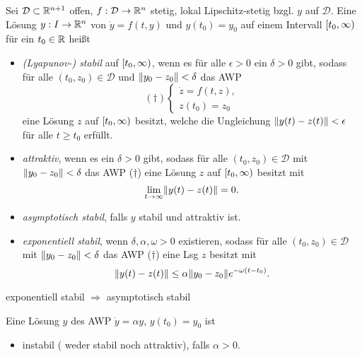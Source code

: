 \documentclass{cheat-sheet}
\newcommand{\D}{\mathcal{D}}
\begin{document}




\begin{defn}
  Sei $\D \subset \R^{n+1}$ offen, $f : \D \to \R^n$ stetig, lokal Lipschitz-stetig bzgl. $y$ auf $\D$. Eine Lösung $y : I \to \mathbb{R}^n$ von $\dot{y} = f(t, y)$ und $y(t_0) = y_0$ auf einem Intervall $\left[ t_0, \infty \right)$ für ein $t_0 \in \mathbb{R}$ heißt
  \begin{itemize}
    \item \emph{(Lyapunov-) stabil} auf $\left[ t_0, \infty \right)$, wenn es für alle $\epsilon > 0$ ein $\delta > 0$ gibt, sodass für alle $(t_0, z_0) \in \D$ und $\lVert y_0 - z_0\rVert < \delta$ das AWP
    \[
      (\dagger) \left\{ \begin{array}{ll}
        \dot{z} = f(t, z),\\
        z(t_0) = z_0
      \end{array} \right.
    \]
    eine Lösung $z$ auf $\left[ t_0, \infty \right)$ besitzt, welche die Ungleichung $\lVert y(t) - z(t)\rVert < \epsilon$ für alle $t \geq t_0$ erfüllt.
    \item \emph{attraktiv}, wenn es ein $\delta > 0$ gibt, sodass für alle $(t_0, z_0) \in \D$ mit $\lVert y_0 - z_0\rVert < \delta$ das AWP ($\dagger$) eine Lösung $z$ auf $\left[ t_0, \infty \right)$ besitzt mit
    \[ \lim_{t \to \infty} \lVert y(t) - z(t)\rVert = 0. \]
    \item \emph{asymptotisch stabil}, falls $y$ stabil und attraktiv ist.
    \item \emph{exponentiell stabil}, wenn $\delta, \alpha, \omega > 0$ existieren, sodass für alle $(t_0, z_0) \in \D$ mit $\lVert y_0 - z_0\rVert < \delta$ das AWP ($\dagger$) eine Lsg $z$ besitzt mit
    \[ \lVert y(t) - z(t)\rVert \leq \alpha \lVert y_0 - z_0\rVert e^{-\omega (t-t_0)}. \]
  \end{itemize}
\end{defn}

\begin{bem}
  exponentiell stabil $\Rightarrow$ asymptotisch stabil
\end{bem}

\begin{bsp}
  Eine Lösung $y$ des AWP $\dot{y} = \alpha y$, $y(t_0) = y_0$ ist
  \begin{itemize}
    \item instabil (\dh{} weder stabil noch attraktiv), falls $\alpha > 0$.
  \end{itemize}
\end{bsp}
\end{document}
